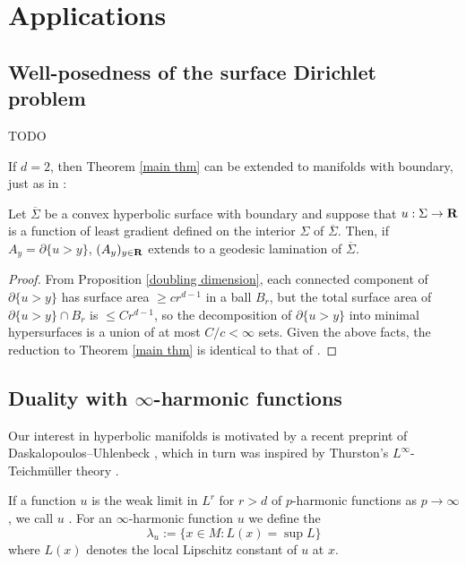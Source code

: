\section{Applications}\label{proof of main thm}
\subsection{Well-posedness of the surface Dirichlet problem}
TODO 

If $d = 2$, then Theorem \ref{main thm} can be extended to manifolds with boundary, just as in \cite[Corollary 3.5]{górny2017planar}:

\begin{proposition}\label{main crly}
Let $\overline \Sigma$ be a convex hyperbolic surface with boundary and suppose that $u: \Sigma \to \mathbf{R}$ is a function of least gradient defined on the interior $\Sigma$ of $\overline \Sigma$.
Then, if $A_y = \partial \{u > y\}$, $(A_y)_{y \in \mathbf{R}}$ extends to a geodesic lamination of $\overline \Sigma$.
\end{proposition}
\begin{proof}
From Proposition \ref{doubling dimension}, each connected component of $\partial \{u > y\}$ has surface area $\geq cr^{d - 1}$ in a ball $B_r$, but the total surface area of $\partial \{u > y\} \cap B_r$ is $\leq Cr^{d - 1}$, so the decomposition of $\partial \{u > y\}$ into minimal hypersurfaces is a union of at most $C/c < \infty$ sets.
Given the above facts, the reduction to Theorem \ref{main thm} is identical to that of \cite[Corollary 3.5]{górny2017planar}.
\end{proof}


\subsection{Duality with \texorpdfstring{$\infty$}{infinity}-harmonic functions}
Our interest in hyperbolic manifolds is motivated by a recent preprint of Daskalopoulos--Uhlenbeck \cite{daskalopoulos2020transverse}, which in turn was inspired by Thurston's $L^\infty$-Teichm\"uller theory \cite{thurston1998minimal}. 

\begin{definition}
If a function $u$ is the weak limit in $L^r$ for $r > d$ of $p$-harmonic functions as $p \to \infty$, we call $u$ .
For an $\infty$-harmonic function $u$ we define the 
$$\lambda_u := \{x \in M: L(x) = \sup L\}$$
where $L(x)$ denotes the local Lipschitz constant of $u$ at $x$.
\end{definition}

